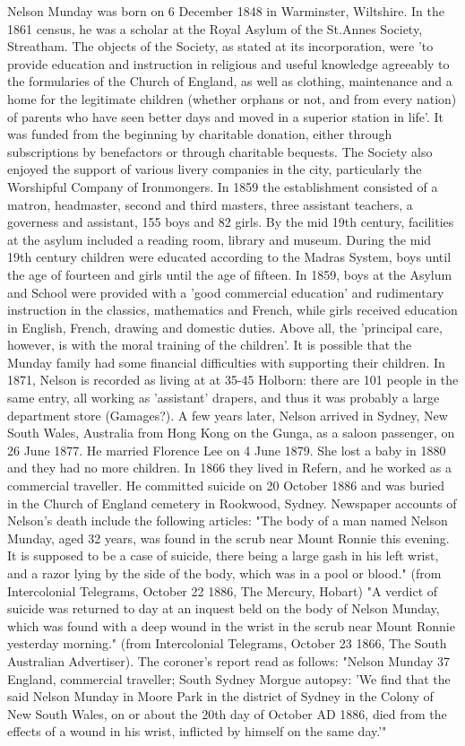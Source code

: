 Nelson Munday was born on 6 December 1848 in	Warminster, Wiltshire. In the 1861 census, he was a scholar at the Royal Asylum of the St.Annes Society, Streatham. The objects of the Society, as stated at its incorporation, were 'to provide education and instruction in religious and useful knowledge agreeably to the formularies of the Church of England, as well as clothing, maintenance and a home for the legitimate children (whether orphans or not, and from every nation) of parents who have seen better days and moved in a superior station in life'. It was funded from the beginning by charitable donation, either through subscriptions by benefactors or through charitable bequests. The Society also enjoyed the support of various livery companies in the city, particularly the Worshipful Company of Ironmongers. In 1859 the establishment consisted of a matron, headmaster, second and third masters, three assistant teachers, a governess and assistant, 155 boys and 82 girls. By the mid 19th century, facilities at the asylum included a reading room, library and museum. During the mid 19th century children were educated according to the Madras System, boys until the age of fourteen and girls until the age of fifteen. In 1859, boys at the Asylum and School were provided with a 'good commercial education' and rudimentary instruction in the classics, mathematics and French, while girls received education in English, French, drawing and domestic duties. Above all, the 'principal care, however, is with the moral training of the children'. It is possible that the Munday family had some financial difficulties with supporting their children.
In 1871, Nelson is recorded as living at at 35-45 Holborn: there are 101 people in the same entry, all working as 'assistant' drapers, and thus it was probably a large department store (Gamages?). A few years later, Nelson arrived in Sydney, New South Wales, Australia from Hong Kong on the Gunga, as a saloon passenger, on 26 June 1877. He married Florence Lee on 4 June 1879. She lost a baby in 1880 and they had no more children. In 1866 they lived in Refern, and he worked as a commercial traveller.  He committed suicide on 20 October 1886 and was buried in the Church of England cemetery in Rookwood, Sydney.
Newspaper accounts of Nelson's death include the following articles: 
  "The body of a man named Nelson Munday, aged 32 years, was found in the scrub near Mount Ronnie this evening. It is supposed to be a case of suicide, there being a large gash in his left wrist, and a razor lying by the side of the body, which was in a pool or blood." (from Intercolonial Telegrams, October 22 1886, The Mercury, Hobart) 
 "A verdict of suicide was returned to day at an inquest beld on the body of Nelson Munday, which was found with a deep wound in the wrist in the scrub near Mount Ronnie yesterday morning." (from Intercolonial Telegrams, October 23 1866, The South Australian Advertiser). The coroner's report read as follows: 
"Nelson Munday 37 England, commercial traveller; South Sydney Morgue autopsy:
'We find that the said Nelson Munday in Moore Park in the district of Sydney in the Colony of New South Wales, on or about the 20th day of October AD 1886, died from the effects of a wound in his wrist, inflicted by himself on the same day.'"

